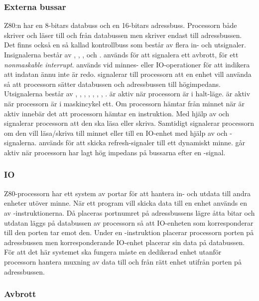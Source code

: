 \documentclass[main.tex]{subfiles}
\begin{document}
\subsubsection{Externa bussar}
Z80:n har en 8-bitars databuss och en 16-bitars adressbuss. Processorn både
skriver och läser till och från databussen men skriver endast till
adressbussen. Det finns också en så kallad kontrollbuss som består av flera in-
och utsignaler. Insignalerna består av , , ,
 och .  används för att signalera ett
avbrott,  för ett {\it nonmaskable interrupt}.  används
vid minnes- eller IO-operationer för att indikera att indatan ännu inte är
redo.  signalerar till processorn att en enhet vill använda så att
processorn sätter databussen och adressbussen till högimpedans. Utsignalerna
består av , , , , ,
, , .  är aktiv när processorn är i
halt-läge.  är aktiv när processorn är i maskincykel ett. Om
processorn hämtar från minnet när  är aktiv innebär det att processorn
hämtar en instruktion. Med hjälp av  och  signalerar
processorn att den ska läsa eller skriva. Samtidigt signalerar processorn om
den vill läsa/skriva till minnet eller till en IO-enhet med hjälp av
 och -signalerna.  används för att skicka
refresh-signaler till ett dynamiskt minne.  går aktiv när
processorn har lagt hög impedans på bussarna efter en -signal.

\subsubsection{IO}
Z80-processorn har ett system av portar för att hantera in- och utdata till
andra enheter utöver minne. När ett program vill skicka data till en enhet
används en av -instruktionerna. Då placeras portnumret på
adressbussens lägre åtta bitar och utdatan läggs på databussen av processorn så
att IO-enheten som korresponderar till den porten tar emot den. Under en
-instruktion placerar processorn porten på adressbussen men
korresponderande IO-enhet placerar sin data på databussen. För att det här
systemet ska fungera måste en dedikerad enhet utanför processorn hantera
muxning av data till och från rätt enhet utifrån porten på adressbussen.

\subsubsection{Avbrott}
\end{document}

